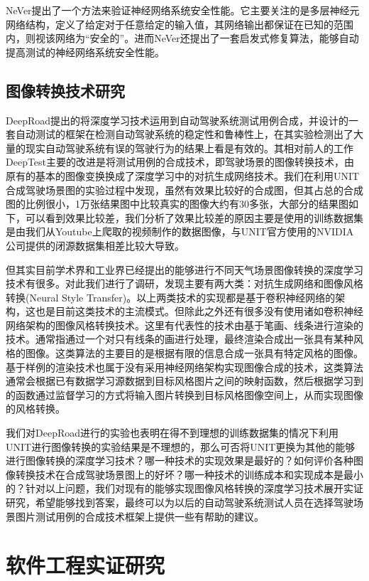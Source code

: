 NeVer\cite{dsv}提出了一个方法来验证神经网络系统安全性能。它主要关注的是多层神经元网络结构，定义了给定对于任意给定的输入值，其网络输出都保证在已知的范围内，则视该网络为“安全的”。进而NeVer还提出了一套启发式修复算法，能够自动提高测试的神经网络系统安全性能。

\subsection{图像转换技术研究}

DeepRoad提出的将深度学习技术运用到自动驾驶系统测试用例合成，并设计的一套自动测试的框架在检测自动驾驶系统的稳定性和鲁棒性上，在其实验检测出了大量的现实自动驾驶系统有误的驾驶行为的结果\cite{DeepRoad}上看是有效的。其相对前人的工作DeepTest主要的改进是将测试用例的合成技术，即驾驶场景的图像转换技术，由原有的基本的图像变换换成了深度学习中的对抗生成网络技术。我们在利用UNIT合成驾驶场景图的实验过程中发现，虽然有效果比较好的合成图，但其占总的合成图的比例很小，1万张结果图中比较真实的图像大约有30多张，大部分的结果图如下，可以看到效果比较差，我们分析了效果比较差的原因主要是使用的训练数据集是由我们从Youtube上爬取的视频制作的数据图像，与UNIT官方使用的NVIDIA公司提供的闭源数据集相差比较大导致。

但其实目前学术界和工业界已经提出的能够进行不同天气场景图像转换的深度学习技术有很多。对此我们进行了调研，发现主要有两大类：对抗生成网络和图像风格转换(Neural Style Transfer)。以上两类技术的实现都是基于卷积神经网络的架构，这也是目前这类技术的主流模式。但除此之外还有很多没有使用诸如卷积神经网络架构的图像风格转换技术。这里有代表性的技术由基于笔画、线条进行渲染的技术。通常指通过一个对只有线条的画进行处理，最终渲染合成出一张具有某种风格的图像。这类算法的主要目的是根据有限的信息合成一张具有特定风格的图像。基于样例的渲染技术也属于没有采用神经网络架构实现图像合成的技术，这类算法通常会根据已有数据学习源数据到目标风格图片之间的映射函数，然后根据学习到的函数通过监督学习的方式将输入图片转换到目标风格图像空间上，从而实现图像的风格转换。

我们对DeepRoad进行的实验也表明在得不到理想的训练数据集的情况下利用UNIT进行图像转换的实验结果是不理想的，那么可否将UNIT更换为其他的能够进行图像转换的深度学习技术？哪一种技术的实现效果是最好的？如何评价各种图像转换技术在合成驾驶场景图上的好坏？哪一种技术的训练成本和实现成本是最小的？针对以上问题，我们对现有的能够实现图像风格转换的深度学习技术展开实证研究，希望能够找到答案，最终可以为以后的自动驾驶系统测试人员在选择驾驶场景图片测试用例的合成技术框架上提供一些有帮助的建议。


\section{软件工程实证研究}　

